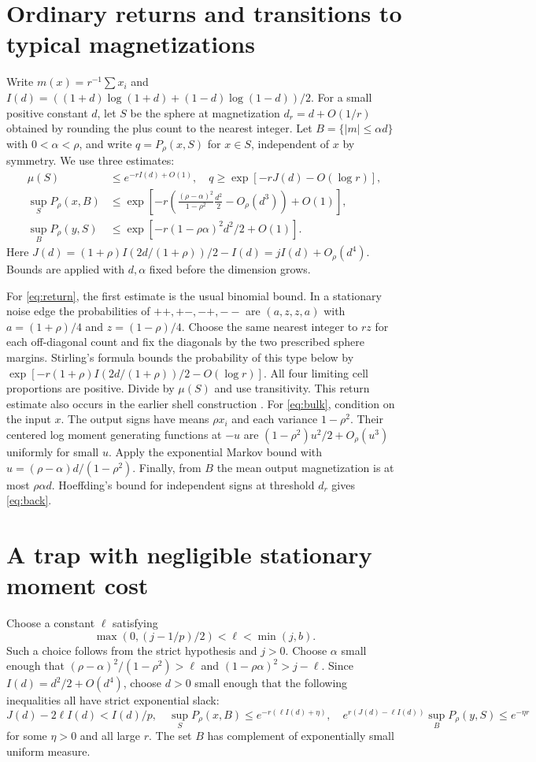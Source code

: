 \documentclass[11pt]{article}
\begin{document}
\section{Ordinary returns and transitions to typical magnetizations}
Write $m(x)=r^{-1}\sum x_i$ and $I(d)=((1+d)\log(1+d)+(1-d)\log(1-d))/2$.
For a small positive constant $d$, let $S$ be the sphere at magnetization $d_r=d+O(1/r)$ obtained by rounding the plus count to the nearest integer. Let $B=\{|m|\le\alpha d\}$ with $0<\alpha<\rho$, and write $q=P_\rho(x,S)$ for $x\in S$, independent of $x$ by symmetry. We use three estimates:
\begin{align}
 \mu(S)&\le e^{-rI(d)+O(1)},\quad
 q\ge \exp[-rJ(d)-O(\log r)], \label{eq:return}\\
 \sup_{S} P_\rho(x,B)&\le
 \exp\left[-r\left(\frac{(\rho-\alpha)^2}{1-\rho^2}\frac{d^2}{2}
                  -O_\rho(d^3)\right)+O(1)\right],\label{eq:bulk}\\
 \sup_{B} P_\rho(y,S)&\le \exp[-r(1-\rho\alpha)^2d^2/2+O(1)] .\label{eq:back}
\end{align}
Here $J(d)=(1+\rho)I(2d/(1+\rho))/2-I(d)=j I(d)+O_\rho(d^4)$. Bounds are applied with $d,\alpha$ fixed before the dimension grows.

For \eqref{eq:return}, the first estimate is the usual binomial bound. In a stationary noise edge the probabilities of $++,+-,-+,--$ are $(a,z,z,a)$ with $a=(1+\rho)/4$ and $z=(1-\rho)/4$. Choose the same nearest integer to $rz$ for each off-diagonal count and fix the diagonals by the two prescribed sphere margins. Stirling's formula bounds the probability of this type below by $\exp[-r(1+\rho)I(2d/(1+\rho))/2-O(\log r)]$. All four limiting cell proportions are positive. Divide by $\mu(S)$ and use transitivity. This return estimate also occurs in the earlier shell construction \cite{shell}. For \eqref{eq:bulk}, condition on the input $x$. The output signs have means $\rho x_i$ and each variance $1-\rho^2$. Their centered log moment generating functions at $-u$ are $(1-\rho^2)u^2/2+O_\rho(u^3)$ uniformly for small $u$. Apply the exponential Markov bound with $u=(\rho-\alpha)d/(1-\rho^2)$. Finally, from $B$ the mean output magnetization is at most $\rho\alpha d$. Hoeffding's bound for independent signs at threshold $d_r$ gives \eqref{eq:back}.

\section{A trap with negligible stationary moment cost}
Choose a constant $\ell$ satisfying
\[
 \max(0,(j-1/p)/2)<\ell<\min(j,b).
\]
Such a choice follows from the strict hypothesis and $j>0$. Choose $\alpha$ small enough that $(\rho-\alpha)^2/(1-\rho^2)>\ell$ and $(1-\rho\alpha)^2>j-\ell$. Since $I(d)=d^2/2+O(d^4)$, choose $d>0$ small enough that the following inequalities all have strict exponential slack:
\[
 J(d)-2\ell I(d)<I(d)/p,\quad
 \sup_S P_\rho(x,B)\le e^{-r(\ell I(d)+\eta)},\quad
 e^{r(J(d)-\ell I(d))}\sup_B P_\rho(y,S)\le e^{-\eta r}
\]
for some $\eta>0$ and all large $r$. The set $B$ has complement of exponentially small uniform measure.
\end{document}
